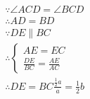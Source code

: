 \documentclass[answers]{exam}
\begin{document}
\begin{questions}
\begin{figure}[htbp]
	\end{figure}

	\begin{solution}
		\begin{align*}
			 & \because \angle{ACD} = \angle{BCD}                  \\
			 & \therefore AD = BD                                  \\
			 & \because DE \parallel BC                            \\
			 & \therefore
			\begin{cases}
				AE = EC \\
				\frac{DE}{BC} = \frac{AE}{AC}
			\end{cases}                           \\
			 & \therefore DE = BC\frac{\frac{1}{2}a}{a} = \frac12b
		\end{align*}
	\end{solution}

\end{questions}
\end{document}

